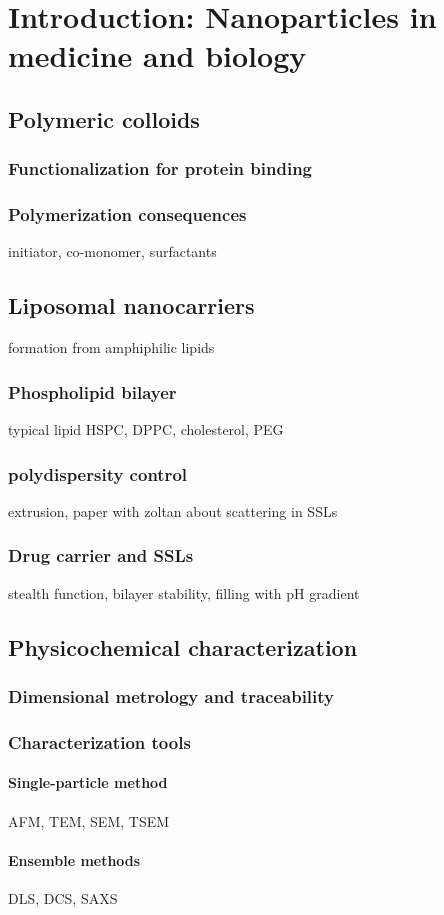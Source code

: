 \chapter{Introduction: Nanoparticles in medicine and biology}
\label{chap:introduction}
\blindtext[1]\cite{araki_resonant_2006}

\section{Polymeric colloids}
\subsection{Functionalization for protein binding}

\subsection{Polymerization consequences}
initiator, co-monomer, surfactants

\section{Liposomal nanocarriers}
formation from amphiphilic lipids
\subsection{Phospholipid bilayer}
typical lipid HSPC, DPPC, cholesterol, PEG

\subsection{polydispersity control}
extrusion, paper with zoltan about scattering in SSLs

\subsection{Drug carrier and SSLs}
stealth function, bilayer stability, filling with pH gradient

\section{Physicochemical characterization}
\subsection{Dimensional metrology and traceability}

\subsection{Characterization tools}
\subsubsection{Single-particle method}
AFM, TEM, SEM, TSEM

\subsubsection{Ensemble methods}
DLS, DCS, SAXS


